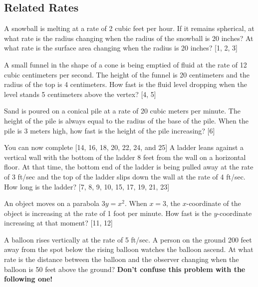\documentclass[addpoints, 12pt]{exam}
\begin{document}
\newpage
{}
\subsection*{Related Rates}
\begin{questions}
    \question A snowball is melting at a rate of 2 cubic feet per hour.  If it remains spherical, at what rate is the radius changing when the radius of the snowball is 20 inches?  At what rate is the surface area changing when the radius is 20 inches?  [1, 2, 3]
    
    \question A small funnel in the shape of a cone is being emptied of fluid at the rate of 12 cubic centimeters per second.  The height of the funnel is 20 centimeters and the radius of the top is 4 centimeters.  How fast is the fluid level dropping when the level stands 5 centimeters above the vertex?  [4, 5]
    
    \newpage
    
    \question Sand is poured on a conical pile at a rate of 20 cubic meters per minute.  The height of the pile is always equal to the radius of the base of the pile.  When the pile is 3 meters high, how fast is the height of the pile increasing?  [6]
    
    You can now complete [14, 16, 18, 20, 22, 24, and 25]
    \question A ladder leans against a vertical wall with the bottom of the ladder 8 feet from the wall on a horizontal floor.  At that time, the bottom end of the ladder is being pulled away at the rate of 3 ft/sec and the top of the ladder slips down the wall at the rate of 4 ft/sec.  How long is the ladder?  [7, 8, 9, 10, 15, 17, 19, 21, 23]
    
    \question An object moves on a parabola $3y=x^2$. When $x = 3$, the $x$-coordinate of the object is increasing at the rate of 1 foot per minute.  How fast is the $y$-coordinate increasing at that moment?  [11, 12]
    
    \newpage
    
    \question A balloon rises vertically at the rate of 5 ft/sec.  A person on the ground 200 feet away from the spot below the rising balloon watches the balloon ascend.  At what rate is the distance between the balloon and the observer changing when the balloon is 50 feet above the ground? \textbf{Don’t confuse this problem with the following one!}
    

\end{questions}
\end{document}
